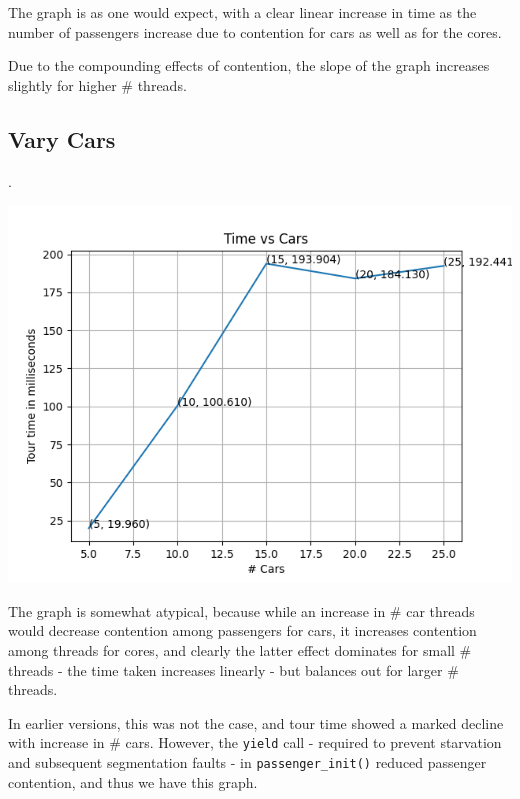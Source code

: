 \documentclass{amsart}
\begin{document}
The graph is as one would expect, with a clear linear increase in time as the number of passengers increase due to contention for cars as well as for the cores.

Due to the compounding effects of contention, the slope of the graph increases slightly for higher \# threads.

\subsection{Vary Cars}.

\includegraphics[scale = 0.9]{cars.png}

The graph is somewhat atypical, because while an increase in \# car threads would decrease contention among passengers for cars, it increases contention among threads for cores, and clearly the latter effect dominates for small \# threads - the time taken increases linearly - but balances out for larger \# threads.

In earlier versions, this was not the case, and tour time showed a marked decline with increase in \# cars. However, the \texttt{yield} call - required to prevent starvation and subsequent segmentation faults - in \texttt{passenger\_init()} reduced passenger contention, and thus we have this graph.
\end{document}
